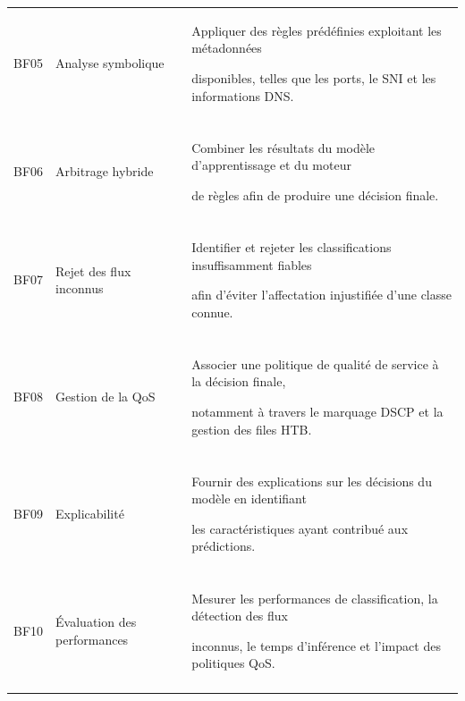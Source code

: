 \begin{table}[H]
\begin{tabularx}{\textwidth}{|p{1.4cm}|p{3.2cm}|Y|}
BF05 & Analyse symbolique &

Appliquer des règles prédéfinies exploitant les métadonnées

disponibles, telles que les ports, le SNI et les informations DNS. \\\\

\hline



BF06 & Arbitrage hybride &

Combiner les résultats du modèle d'apprentissage et du moteur

de règles afin de produire une décision finale. \\\\

\hline



BF07 & Rejet des flux inconnus &

Identifier et rejeter les classifications insuffisamment fiables

afin d'éviter l'affectation injustifiée d'une classe connue. \\\\

\hline



BF08 & Gestion de la QoS &

Associer une politique de qualité de service à la décision finale,

notamment à travers le marquage DSCP et la gestion des files HTB. \\\\

\hline



BF09 & Explicabilité &

Fournir des explications sur les décisions du modèle en identifiant

les caractéristiques ayant contribué aux prédictions. \\\\

\hline



BF10 & Évaluation des performances &

Mesurer les performances de classification, la détection des flux

inconnus, le temps d'inférence et l'impact des politiques QoS. \\\\

\hline



\end{tabularx}

\end{table}





